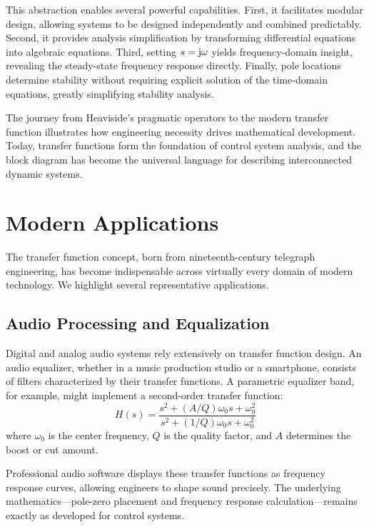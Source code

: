 This abstraction enables several powerful capabilities. First, it facilitates modular design, allowing systems to be designed independently and combined predictably. Second, it provides analysis simplification by transforming differential equations into algebraic equations. Third, setting $s = \mathrm{j}\omega$ yields frequency-domain insight, revealing the steady-state frequency response directly. Finally, pole locations determine stability without requiring explicit solution of the time-domain equations, greatly simplifying stability analysis.

The journey from Heaviside's pragmatic operators to the modern transfer function illustrates how engineering necessity drives mathematical development. Today, transfer functions form the foundation of control system analysis, and the block diagram has become the universal language for describing interconnected dynamic systems.

\section{Modern Applications}
\label{sec:modern_applications}

The transfer function concept, born from nineteenth-century telegraph engineering, has become indispensable across virtually every domain of modern technology. We highlight several representative applications.

\subsection{Audio Processing and Equalization}

Digital and analog audio systems rely extensively on transfer function design. An audio equalizer, whether in a music production studio or a smartphone, consists of filters characterized by their transfer functions. A parametric equalizer band, for example, might implement a second-order transfer function:
\begin{equation}
H(s) = \frac{s^2 + (A/Q)\omega_0 s + \omega_0^2}{s^2 + (1/Q)\omega_0 s + \omega_0^2}
\end{equation}
where $\omega_0$ is the center frequency, $Q$ is the quality factor, and $A$ determines the boost or cut amount.

Professional audio software displays these transfer functions as frequency response curves, allowing engineers to shape sound precisely. The underlying mathematics---pole-zero placement and frequency response calculation---remains exactly as developed for control systems.

